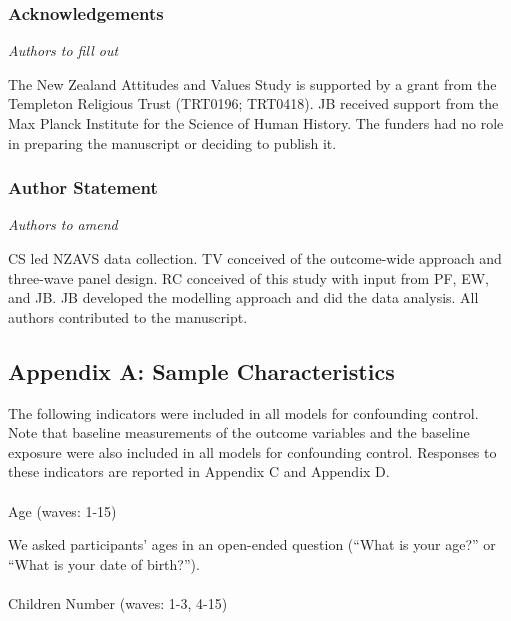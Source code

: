 \documentclass[
  single column]{article}
\makeatletter
\let\oldparagraph\paragraph
\renewcommand{\paragraph}{
    \@ifstar
      \xxxParagraphStar
      \xxxParagraphNoStar
  }
\newcommand{\xxxParagraphStar}[1]{\oldparagraph*{#1}\mbox{}}
\newcommand{\xxxParagraphNoStar}[1]{\oldparagraph{#1}\mbox{}}
\makeatother
\begin{document}
\subsubsection{Acknowledgements}\label{acknowledgements}

\emph{Authors to fill out}

The New Zealand Attitudes and Values Study is supported by a grant from
the Templeton Religious Trust (TRT0196; TRT0418). JB received support
from the Max Planck Institute for the Science of Human History. The
funders had no role in preparing the manuscript or deciding to publish
it.

\subsubsection{Author Statement}\label{author-statement}

\emph{Authors to amend}

CS led NZAVS data collection. TV conceived of the outcome-wide approach
and three-wave panel design. RC conceived of this study with input from
PF, EW, and JB. JB developed the modelling approach and did the data
analysis. All authors contributed to the manuscript.

\newpage{}

\subsection{Appendix A: Sample Characteristics}\label{appendix-measures}

The following indicators were included in all models for confounding
control. Note that baseline measurements of the outcome variables and
the baseline exposure were also included in all models for confounding
control. Responses to these indicators are reported in Appendix C and
Appendix D.

\paragraph{Age (waves: 1-15)}\label{age-waves-1-15}

We asked participants' ages in an open-ended question (``What is your
age?'' or ``What is your date of birth?'').

\paragraph{Children Number (waves: 1-3,
4-15)}\label{children-number-waves-1-3-4-15}
\end{document}

